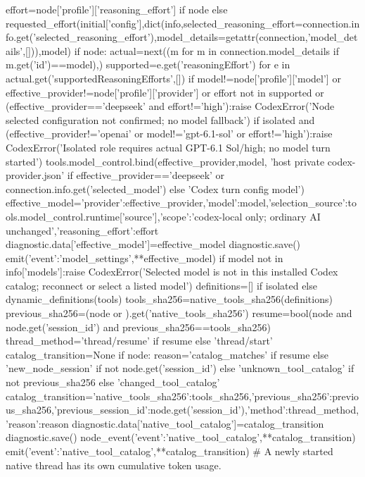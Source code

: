         effort=node['profile']['reasoning_effort'] if node else requested_effort(initial['config'],dict(info,selected_reasoning_effort=connection.info.get('selected_reasoning_effort'),model_details=getattr(connection,'model_details',[])),model)
        if node:
            actual=next((m for m in connection.model_details if m.get('id')==model),{})
            supported={e.get('reasoningEffort') for e in actual.get('supportedReasoningEfforts',[])}
            if model!=node['profile']['model'] or effective_provider!=node['profile']['provider'] or effort not in supported or (effective_provider=='deepseek' and effort!='high'):raise CodexError('Node selected configuration not confirmed; no model fallback')
        if isolated and (effective_provider!='openai' or model!='gpt-6.1-sol' or effort!='high'):raise CodexError('Isolated role requires actual GPT-6.1 Sol/high; no model turn started')
        tools.model_control.bind(effective_provider,model, 'host private codex-provider.json' if effective_provider=='deepseek' or connection.info.get('selected_model') else 'Codex turn config model')
        effective_model={'provider':effective_provider,'model':model,'selection_source':tools.model_control.runtime['source'],'scope':'codex-local only; ordinary AI unchanged','reasoning_effort':effort}
        diagnostic.data['effective_model']=effective_model
        diagnostic.save()
        emit({'event':'model_settings',**effective_model})
        if model not in info['models']:raise CodexError('Selected model is not in this installed Codex catalog; reconnect or select a listed model')
        definitions=[] if isolated else dynamic_definitions(tools)
        tools_sha256=native_tools_sha256(definitions)
        previous_sha256=(node or {}).get('native_tools_sha256')
        resume=bool(node and node.get('session_id') and previous_sha256==tools_sha256)
        thread_method='thread/resume' if resume else 'thread/start'
        catalog_transition=None
        if node:
            reason='catalog_matches' if resume else 'new_node_session' if not node.get('session_id') else 'unknown_tool_catalog' if not previous_sha256 else 'changed_tool_catalog'
            catalog_transition={'native_tools_sha256':tools_sha256,'previous_sha256':previous_sha256,'previous_session_id':node.get('session_id'),'method':thread_method,'reason':reason}
            diagnostic.data['native_tool_catalog']=catalog_transition
            diagnostic.save()
            node_event({'event':'native_tool_catalog',**catalog_transition})
            emit({'event':'native_tool_catalog',**catalog_transition})
            # A newly started native thread has its own cumulative token usage.
